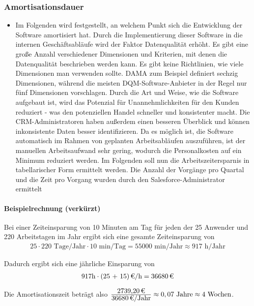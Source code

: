 \subsubsection{Amortisationsdauer}
\label{sec:Amortisationsdauer}
\begin{itemize}
	\item Im Folgenden wird festgestellt, an welchem Punkt sich die Entwicklung der Software amortisiert hat.
    Durch die Implementierung dieser Software in die internen Geschäftsabläufe wird der Faktor Datenqualität erhöht. 
 	Es gibt eine große Anzahl verschiedener Dimensionen und Kriterien, mit denen die Datenqualität beschrieben werden kann. 
	Es gibt keine Richtlinien, wie viele Dimensionen man verwenden sollte. 
	DAMA zum Beispiel definiert sechzig Dimensionen, während die meisten DQM-Software-Anbieter in der Regel nur fünf Dimensionen vorschlagen.
	Durch die Art und Weise, wie die Software aufgebaut ist, wird das Potenzial für Unannehmlichkeiten für den Kunden reduziert - was den potenziellen Handel schneller und konsistenter macht.
	Die CRM-Administratoren haben außerdem einen besseren Überblick und können inkonsistente Daten besser identifizieren.
	Da es möglich ist, die Software automatisch im Rahmen von geplanten Arbeitsabläufen auszuführen, ist der manuellen Arbeitsaufwand sehr gering, wodurch die Personalkosten auf ein Minimum reduziert werden.
	Im Folgenden soll nun die Arbeitszeitersparnis in tabellarischer Form ermittelt werden. Die Anzahl der Vorgänge
	pro Quartal und die Zeit pro Vorgang wurden durch den Salesforce-Administrator ermittelt
\end{itemize}

\paragraph{Beispielrechnung (verkürzt)}
Bei einer Zeiteinsparung von 10 Minuten am Tag für jeden der 25 Anwender und 220 Arbeitstagen im Jahr ergibt sich eine gesamte Zeiteinsparung von 
\begin{eqnarray}
25 \cdot 220 \mbox{ Tage/Jahr} \cdot 10 \mbox{ min/Tag} = 55000 \mbox{ min/Jahr} \approx 917 \mbox{ h/Jahr} 
\end{eqnarray}

Dadurch ergibt sich eine jährliche Einsparung von 
\begin{eqnarray}
917 \mbox{h} \cdot \eur{(25 + 15)}{\mbox{/h}} = \eur{36680}
\end{eqnarray}

Die Amortisationszeit beträgt also $\frac{\eur{2739,20}}{\eur{36680}\mbox{/Jahr}} \approx 0,07 \mbox{ Jahre} \approx 4 \mbox{ Wochen}$.


